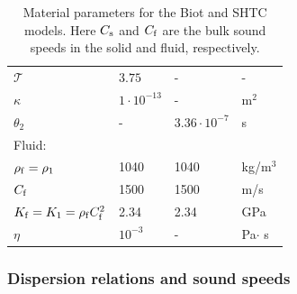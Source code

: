 \documentclass[3p,times,table]{article}
\newcommand{\tort}{{\mathcal{T}}}
\newcommand{\Km}{K_{\rm m}}
\newcommand{\Kf}{K_{\rm f}}
\newcommand{\rhof}{\rho_{\rm f}}
\newcommand{\Cf}{C_{\rm f}}
\begin{document}
\begin{table}[]
\begin{center}
\begin{tabular}{llll}
			$ \tort $     & $ 3.75 $           &   -       & 
			-                            \\[1mm]
			\rowcolor[HTML]{ECF4FF} 
			$ \kappa $ & $ 1\cdot10^{-13} $      &     -     & m$ ^2 
			$                	\\[1mm]
			\rowcolor[HTML]{CBCEFB}
			$ \theta_2 $       & - &  $ 3.36\cdot10^{-7}$  & s  \\[1mm]
			Fluid:		& & &\\[1mm]
			\rowcolor[HTML]{ECF4FF} 
			$ \rhof=\rho_1 $ & 1040        &     1040       & kg/m$ ^3 
			$              \\[1mm]
			\rowcolor[HTML]{CBCEFB} 
			$ \Cf $ & 1500        &     1500       & 
			m/s                              \\[1mm]
			\rowcolor[HTML]{ECF4FF} 
			$ \Kf =K_1=\rhof \Cf^2$     & 2.34          &   2.34       & 
			GPa                   
			\\[1mm]
			\rowcolor[HTML]{CBCEFB} 
			$ \eta $  & $ 10^{-3} $&    -      & Pa$ \cdot $ s             
			\\[1mm]
			\hline
		\end{tabular}
		\caption{ Material parameters for the Biot and SHTC models. Here 
		$C_{\rm s}$ and $C_{\rm f}$ are the bulk sound speeds in the solid and 
		fluid, respectively.}
		\label{tab:parameters}
	\end{center}
\end{table}


\subsubsection{Dispersion relations and sound speeds}
\end{document}

